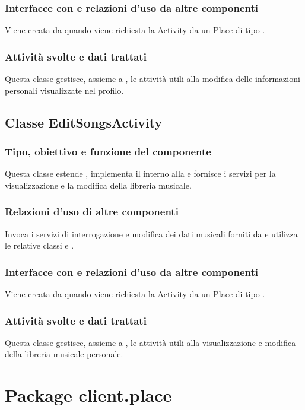 \subsubsection*{Interfacce con e relazioni d'uso da altre componenti}
Viene creata da  quando viene richiesta la Activity da
un Place di tipo .
\subsubsection*{Attivit\`a svolte e dati trattati}
Questa classe gestisce, assieme a , le attivit\`a utili alla
modifica delle informazioni personali visualizzate nel profilo.

\subsection{Classe EditSongsActivity}
\subsubsection*{Tipo, obiettivo e funzione del componente}
Questa classe estende , implementa il 
interno alla  e fornisce i servizi per la visualizzazione e la
modifica della libreria musicale.
\subsubsection*{Relazioni d'uso di altre componenti} Invoca i servizi di
interrogazione e modifica dei dati musicali forniti da  e
utilizza le relative classi  e .
\subsubsection*{Interfacce con e relazioni d'uso da altre componenti}
Viene creata da  quando viene richiesta la Activity da
un Place di tipo .
\subsubsection*{Attivit\`a svolte e dati trattati}
Questa classe gestisce, assieme a , le attivit\`a utili alla
visualizzazione e modifica della libreria musicale personale.

\newpage

\section{Package client.place} %
